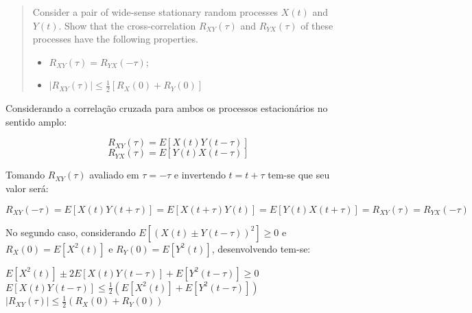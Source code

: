 \begin{quote}
Consider a pair of wide-sense stationary random processes $X(t)$ and $Y(t)$. Show that the cross-correlation $R_{XY}(\tau)$ and $R_{YX}(\tau)$ of these processes have the following properties.
\begin{itemize}
    \item $R_{XY}(\tau) = R_{YX}(-\tau)$;
    \item $|R_{XY}(\tau)| \leq \frac{1}{2}[R_X(0) + R_Y(0)]$
\end{itemize}
\end{quote}

Considerando a correlação cruzada para ambos os processos estacionários no sentido amplo:

\begin{equation} \label{prob:1}
    R_{XY}(\tau) = E[X(t)Y(t-\tau)]
\end{equation}
\begin{equation} \label{prob:2}
    R_{YX}(\tau) = E[Y(t)X(t-\tau)]
\end{equation}

Tomando $R_{XY}(\tau)$ avaliado em $\tau = -\tau$ e invertendo $t=t+\tau$ tem-se que seu valor será:

\begin{equation} \label{prob:3}
    R_{XY}(-\tau) = E[X(t)Y(t+\tau)]= E[X(t+\tau)Y(t)] = E[Y(t)X(t+\tau)] = R_{XY}(\tau) = R_{YX}(-\tau) 
\end{equation}

No segundo caso, considerando $E[(X(t) \pm Y(t-\tau))^2] \geq 0$ e $R_X(0) = E[X^2(t)]$ e $R_Y(0) = E[Y^2(t)]$, desenvolvendo tem-se:

\begin{center}
    $E[X^2(t)] \pm 2E[X(t)Y(t-\tau)] + E[Y^2(t-\tau)] \geq 0$\\ \vspace{2pt}
    $E[X(t)Y(t-\tau)] \leq \frac{1}{2} (E[X^2(t)] + E[Y^2(t-\tau)])$\\ \vspace{2pt}
    $|R_{XY}(\tau)| \leq \frac{1}{2}(R_X(0) + R_Y(0))$
\end{center}